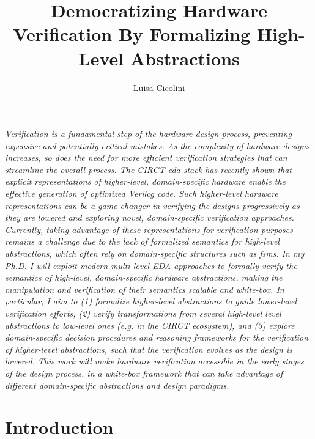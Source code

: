 \documentclass[sigconf,authorversion,nonacm, 11pt]{acmart}
\begin{document}
\title{Democratizing Hardware Verification By Formalizing High-Level Abstractions}

\author{Luisa Cicolini}

\maketitle
\thispagestyle{empty}

\textit{
    Verification is a fundamental step of the hardware design process, preventing expensive and potentially critical mistakes.
    As the complexity of hardware designs increases, so does the need for more efficient verification strategies that can streamline the overall process.
    The CIRCT \ac{eda} stack has recently shown that explicit representations of higher-level, domain-specific hardware enable the effective generation of optimized Verilog code.
    Such higher-level hardware representations can be a game changer in verifying the designs progressively as they are lowered and exploring novel, domain-specific verification approaches. 
    Currently, taking advantage of these representations for verification purposes remains a challenge due to the lack of formalized semantics for high-level abstractions, which often rely on domain-specific structures such as \acp{fsm}.
    In my Ph.D. I will exploit modern multi-level EDA approaches to formally verify the semantics of high-level, domain-specific hardware abstractions, making the manipulation and verification of their semantics scalable and white-box.
    In particular, I aim to
    (1) formalize higher-level abstractions to guide lower-level verification efforts, 
    (2) verify transformations from several high-level level abstractions to low-level ones (e.g. in the CIRCT ecosystem), and
    (3) explore domain-specific decision procedures and reasoning frameworks for the verification of higher-level abstractions, such that the verification evolves as the design is lowered. 
    This work will make hardware verification accessible in the early stages of the design process, in a white-box framework that can take advantage of different domain-specific abstractions and design paradigms.
}   


\section{Introduction}
\end{document}
